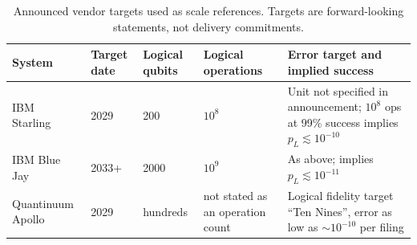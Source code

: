 \begin{table}[htbp]
\centering\small
\caption{Announced vendor targets used as scale references. Targets are forward-looking statements, not delivery commitments.}\label{tab:vendor}
\begin{tabular}{@{}L{3.1cm} L{1.6cm} L{2.4cm} L{2.3cm} L{5.0cm}@{}}
\toprule
System & Target date & Logical qubits & Logical operations & Error target and implied success\\\midrule
IBM Starling~\cite{ibmroadmap2025} & 2029 & 200 & $10^8$ & Unit not specified in announcement; $10^8$ ops at 99\% success implies $p_L\lesssim10^{-10}$\\
IBM Blue Jay~\cite{ibmroadmap2025,hpcwire2025} & 2033+ & 2000 & $10^9$ & As above; implies $p_L\lesssim10^{-11}$\\
Quantinuum Apollo~\cite{quantinuum2024,quantFiling} & 2029 & hundreds & not stated as an operation count & Logical fidelity target ``Ten Nines'', error as low as $\sim10^{-10}$ per filing\\
\bottomrule
\end{tabular}
\end{table}

